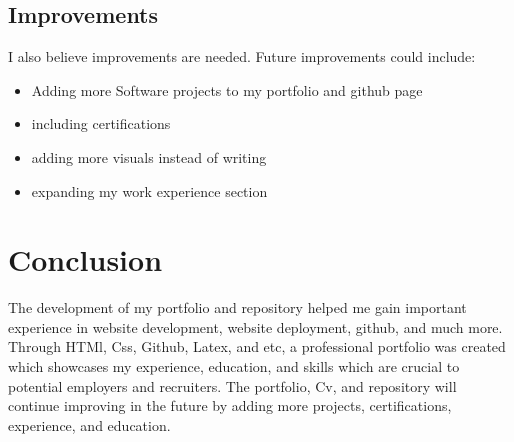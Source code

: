 \documentclass{article}
\begin{document}
\subsection{Improvements}
I also believe improvements are needed. Future improvements could include:
\begin{itemize}
    \item Adding more Software projects to my portfolio and github page
    \item including certifications
    \item adding more visuals instead of writing
    \item expanding my work experience section
\end{itemize}
\section{Conclusion}
The development of my portfolio and repository helped me gain important experience in website development, website deployment, github, and much more.
Through HTMl, Css, Github, Latex, and etc, a professional portfolio was created which showcases my experience, education, and skills which are crucial to potential employers and recruiters. The portfolio, Cv, and repository will continue improving in the future by adding more projects, certifications, experience, and education.
\end{document}
